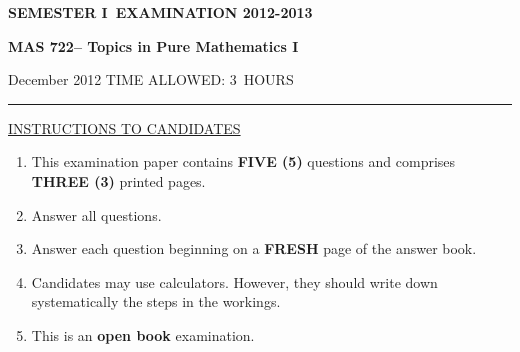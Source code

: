\documentclass[12pt]{article}
\newcommand{\masunitnumber}{MAS 722}
\newcommand{\examdate}{December 2012}
\newcommand{\academicyear}{2012-2013}
\newcommand{\semester}{I}
\newcommand{\coursename}{Topics in Pure Mathematics I}
\newcommand{\numberofhours}{3}
\begin{document}
\setlength{\headsep}{7truemm}
\setlength{\headheight}{14.5truemm}
\setlength{\voffset}{-0.4truein}
\renewcommand{\headrulewidth}{0.0pt}
\begin{center}
\bf SEMESTER \semester\ EXAMINATION \academicyear
\end{center}
\begin{center}
{\bf \masunitnumber -- \coursename}
\end{center}
\vspace{20truemm}

\noindent \examdate\hspace{55truemm} TIME ALLOWED: \numberofhours\ HOURS

\vspace{10truemm}
\hrule
\vspace{10truemm}

\noindent\underline{INSTRUCTIONS TO CANDIDATES}
\vspace{5mm}
\begin{enumerate}
\item  This examination paper contains {\bf FIVE (5)} questions and
comprises {\bf THREE (3)} printed pages.\\
\item
Answer all questions. \\
\item  Answer each question beginning on a {\bf FRESH} page of the answer
book.\\
\item Candidates may use calculators.
However, they should write down systematically the steps in the workings.
\item This is an {\bf open book} examination.
\end{enumerate}

\newpage
\lhead{}
\rhead{\masunitnumber}
\chead{}
\lfoot{}
\cfoot{\thepage}
\rfoot{}
\setlength{\footskip}{45pt}
\newcommand{\Ques}[1]{\paragraph{\underline{Question {#1}}}\hfill\\\vspace{3mm}\\}
\end{document}
